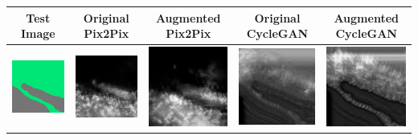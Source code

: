 \documentclass[twocolumn]{article}
\begin{document}
	\begin{table}[t]
	\vspace{-2cm}
		\begin{tabular}{c|c|c|c|c}
 			Test Image & Original Pix2Pix & Augmented Pix2Pix & Original CycleGAN & Augmented CycleGAN \\
 			\hline
 				\includegraphics[trim=0 0 0 -20, width=0.25\columnwidth]{00.png} & \includegraphics[width=0.25\columnwidth]{01.png} & \includegraphics[width=0.25\columnwidth]{02.png} & \includegraphics[width=0.25\columnwidth]{03.png} & \includegraphics[width=0.25\columnwidth]{04.png} \\

\end{tabular}
\end{table}
\end{document}
